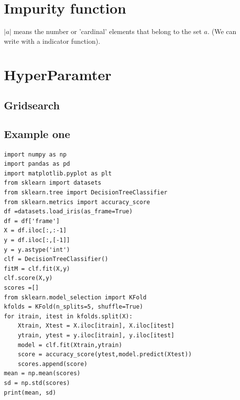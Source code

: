 \documentclass[10pt,a4paper]{article}
\begin{document}
\section{Impurity function}
$\vert a \vert$ means the number or 'cardinal' elements
that belong to the set $a$. (We can write with a indicator function). 




\section{HyperParamter}
\subsection{Gridsearch}

































\subsection{Example one}

\begin{lstlisting}
import numpy as np
import pandas as pd 
import matplotlib.pyplot as plt
from sklearn import datasets
from sklearn.tree import DecisionTreeClassifier
from sklearn.metrics import accuracy_score
df =datasets.load_iris(as_frame=True)
df = df['frame']
X = df.iloc[:,:-1]
y = df.iloc[:,[-1]]
y = y.astype('int')
clf = DecisionTreeClassifier()
fitM = clf.fit(X,y)
clf.score(X,y)
scores =[]
from sklearn.model_selection import KFold
kfolds = KFold(n_splits=5, shuffle=True)
for itrain, itest in kfolds.split(X):
    Xtrain, Xtest = X.iloc[itrain], X.iloc[itest]
    ytrain, ytest = y.iloc[itrain], y.iloc[itest]
    model = clf.fit(Xtrain,ytrain) 
    score = accuracy_score(ytest,model.predict(Xtest))
    scores.append(score)
mean = np.mean(scores)
sd = np.std(scores)
print(mean, sd)
\end{lstlisting}
\end{document}
